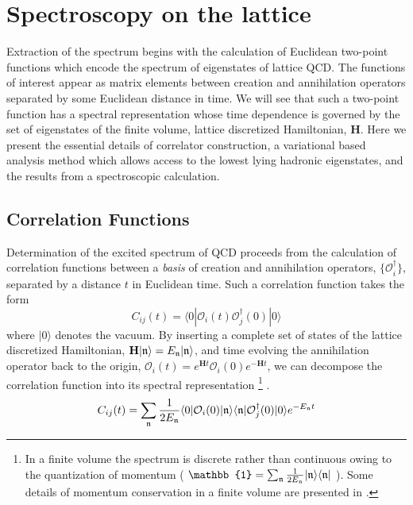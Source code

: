 \chapter{Spectroscopy on the lattice} \label{chap::Spectroscopy}

Extraction of the spectrum begins with the calculation of Euclidean two-point functions which encode the spectrum of eigenstates of lattice QCD. The functions of interest appear as matrix elements between creation and annihilation operators separated by some Euclidean distance in time. We will see that such a two-point function has a spectral representation whose time dependence is governed by the set of eigenstates of the finite volume, lattice discretized Hamiltonian, $\mathbf{H}$.  Here we present the essential details of correlator construction, a variational based analysis method which allows access to the lowest lying hadronic eigenstates, and the results from a spectroscopic calculation. 


\section{Correlation Functions} \label{sec::Spec:corrFunc}

Determination of the excited spectrum of QCD proceeds from the calculation of correlation functions between a \emph{basis} of creation and annihilation operators, $\{\mathcal{O}_i^\dagger\}$, separated by a distance $t$ in Euclidean time. Such a correlation function takes the form 
\begin{equation*}
C_{ij}(t) = \langle 0 | \mathcal{O}_i(t) \mathcal{O}_j^\dagger(0) | 0 \rangle 
\end{equation*}
where $|0\rangle$ denotes the vacuum. By inserting a complete set of states of the lattice discretized Hamiltonian, $\mathbf{H} | \mathfrak{n} \rangle = E_{\mathfrak{n}} | \mathfrak{n} \rangle$, and time evolving the annihilation operator back to the origin, $\mathcal{O}_i(t) = e^{\mathbf{H}t} \mathcal{O}_i(0) e^{-\mathbf{H}t}$, we can decompose the correlation function into its spectral representation \footnote{In a finite volume the spectrum is discrete rather than continuous owing to the quantization of momentum ( $\mathbb{1} = \sum_{\estate{n}} \frac{1}{2E_{\estate{n}}}  | \estate{n} \rangle \langle \estate{n} |$ ). Some details of momentum conservation in a finite volume are presented in . } .
\begin{equation*}
C_{ij}(t) = \sum_{\mathfrak{n}} \frac{1}{2E_{\mathfrak{n}}} \langle 0 | \mathcal{O}_i(0) | \mathfrak{n} \rangle \langle \mathfrak{n} | \mathcal{O}_j^\dagger(0) | 0 \rangle e^{-E_{\mathfrak{n}}t}
\end{equation*}

